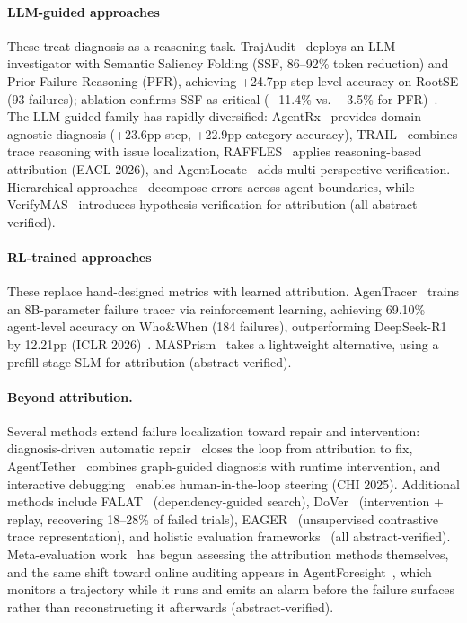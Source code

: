 \paragraph*{LLM-guided approaches}
These treat diagnosis as a reasoning task. TrajAudit~\cite{trajaudit2026} deploys an LLM investigator with Semantic Saliency Folding (SSF, 86--92\% token reduction) and Prior Failure Reasoning (PFR), achieving +24.7pp step-level accuracy on RootSE (93 failures); ablation confirms SSF as critical ($-$11.4\% vs.\ $-$3.5\% for PFR)~\cite{trajaudit2026}. The LLM-guided family has rapidly diversified: AgentRx~\cite{agentrx2026} provides domain-agnostic diagnosis (+23.6pp step, +22.9pp category accuracy), TRAIL~\cite{trail2025} combines trace reasoning with issue localization, RAFFLES~\cite{raffles2026} applies reasoning-based attribution (EACL 2026), and AgentLocate~\cite{agentlocate2026} adds multi-perspective verification. Hierarchical approaches~\cite{hierrerror2025} decompose errors across agent boundaries, while VerifyMAS~\cite{verifymas2026} introduces hypothesis verification for attribution (all abstract-verified).

\paragraph*{RL-trained approaches}
These replace hand-designed metrics with learned attribution. AgenTracer~\cite{agentracer2026} trains an 8B-parameter failure tracer via reinforcement learning, achieving 69.10\% agent-level accuracy on Who\&When (184 failures), outperforming DeepSeek-R1 by 12.21pp (ICLR 2026)~\cite{agentracer2026}. MASPrism~\cite{masprism2026} takes a lightweight alternative, using a prefill-stage SLM for attribution (abstract-verified).

\paragraph*{Beyond attribution.}
Several methods extend failure localization toward repair and intervention: diagnosis-driven automatic repair~\cite{diagrepair2026} closes the loop from attribution to fix, AgentTether~\cite{agenttether2026} combines graph-guided diagnosis with runtime intervention, and interactive debugging~\cite{interactivedebug2025} enables human-in-the-loop steering (CHI 2025). Additional methods include FALAT~\cite{falat2026} (dependency-guided search), DoVer~\cite{dover2026} (intervention + replay, recovering 18--28\% of failed trials), EAGER~\cite{eager2026} (unsupervised contrastive trace representation), and holistic evaluation frameworks~\cite{holisticeval2026} (all abstract-verified). Meta-evaluation work~\cite{whwhpro2026} has begun assessing the attribution methods themselves, and the same shift toward online auditing appears in AgentForesight~\cite{agentforesight2026}, which monitors a trajectory while it runs and emits an alarm before the failure surfaces rather than reconstructing it afterwards (abstract-verified).

